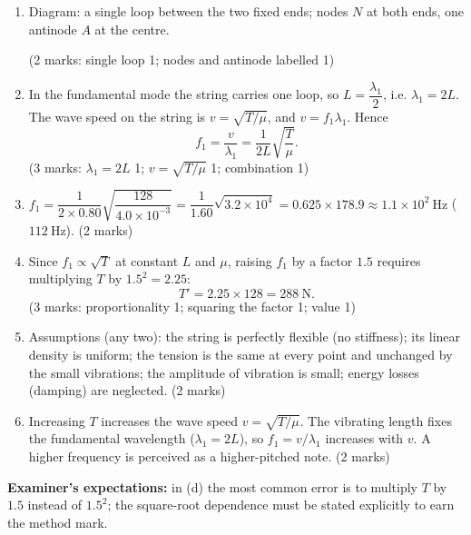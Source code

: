 \documentclass[11pt]{article}
\begin{document}
\begin{corrige}
\begin{enumerate}
\item Diagram: a single loop between the two fixed ends; nodes $N$ at both ends, one antinode $A$ at the centre.
\begin{center}
\end{center}
\hfill (2 marks: single loop 1; nodes and antinode labelled 1)
\item In the fundamental mode the string carries one loop, so $L=\dfrac{\lambda_1}{2}$, i.e. $\lambda_1=2L$. The wave speed on the string is $v=\sqrt{T/\mu}$, and $v=f_1\lambda_1$. Hence
\[f_1=\frac{v}{\lambda_1}=\frac{1}{2L}\sqrt{\frac{T}{\mu}}.\]
\hfill (3 marks: $\lambda_1=2L$ 1; $v=\sqrt{T/\mu}$ 1; combination 1)
\item $f_1=\dfrac{1}{2\times0.80}\sqrt{\dfrac{128}{4.0\times10^{-3}}}=\dfrac{1}{1.60}\sqrt{3.2\times10^{4}}=0.625\times 178.9\approx 1.1\times10^{2}\ \mathrm{Hz}$ ($112\ \mathrm{Hz}$). \hfill (2 marks)
\item Since $f_1\propto\sqrt{T}$ at constant $L$ and $\mu$, raising $f_1$ by a factor $1.5$ requires multiplying $T$ by $1.5^2=2.25$:
\[T'=2.25\times 128=288\ \mathrm{N}.\]
\hfill (3 marks: proportionality 1; squaring the factor 1; value 1)
\item Assumptions (any two): the string is perfectly flexible (no stiffness); its linear density is uniform; the tension is the same at every point and unchanged by the small vibrations; the amplitude of vibration is small; energy losses (damping) are neglected. \hfill (2 marks)
\item Increasing $T$ increases the wave speed $v=\sqrt{T/\mu}$. The vibrating length fixes the fundamental wavelength ($\lambda_1=2L$), so $f_1=v/\lambda_1$ increases with $v$. A higher frequency is perceived as a higher-pitched note. \hfill (2 marks)
\end{enumerate}
\textbf{Examiner's expectations:} in (d) the most common error is to multiply $T$ by $1.5$ instead of $1.5^2$; the square-root dependence must be stated explicitly to earn the method mark.
\end{corrige}
\end{document}
